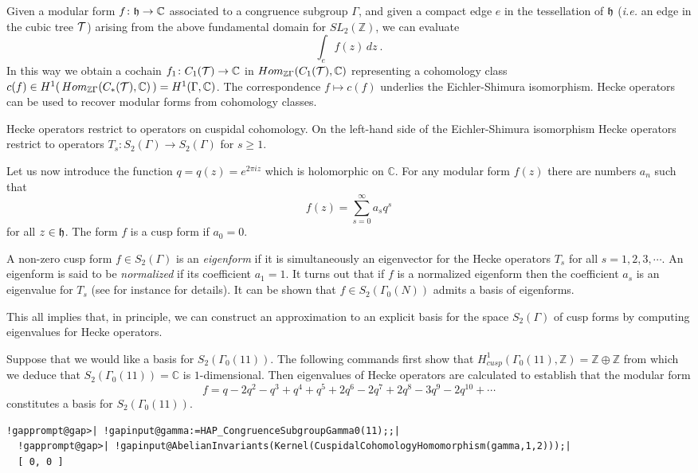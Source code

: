 \documentclass[a4paper,11pt]{report}
\begin{document}
{{Given a modular form $f\colon {\frak h} \rightarrow \mathbb C$ associated to a congruence subgroup $\Gamma$, and given a compact edge $e$ in the tessellation of ${\frak h}$ (\emph{i.e.} an edge in the cubic tree $\cal T$) arising from the above fundamental domain for $SL_2(\mathbb Z)$, we can evaluate 
\[\int_e f(z)\,dz \ .\]
 In this way we obtain a cochain $f_1\colon C_1({\cal T}) \rightarrow \mathbb C$ in $Hom_{\mathbb Z\Gamma}(C_1({\cal T}), \mathbb C)$ representing a cohomology class $c(f) \in H^1(\, Hom_{\mathbb Z\Gamma}(C_\ast({\cal T}), \mathbb C) \,) =
H^1(\Gamma,\mathbb C)$. The correspondence $f\mapsto c(f)$ underlies the Eichler-Shimura isomorphism. Hecke operators can be used to
recover modular forms from cohomology classes. 

Hecke operators restrict to operators on cuspidal cohomology. On the left-hand
side of the Eichler-Shimura isomorphism Hecke operators restrict to operators $T_s\colon S_2(\Gamma) \rightarrow S_2(\Gamma)$ for $s\ge 1$. 

Let us now introduce the function $q=q(z)=e^{2\pi i z}$ which is holomorphic on $\mathbb C$. For any modular form $f(z)$ there are numbers $a_n$ such that 
\[f(z) = \sum_{s=0}^\infty a_sq^s \]
 for all $z\in {\frak h}$. The form $f$ is a cusp form if $a_0=0$. 

 A non-zero cusp form $f\in S_2(\Gamma)$ is an \emph{eigenform} if it is simultaneously an eigenvector for the Hecke operators $T_s$ for all $s =1,2,3,\cdots$. An eigenform is said to be \emph{normalized} if its coefficient $a_1=1$. It turns out that if $f$ is a normalized eigenform then the coefficient $a_s$ is an eigenvalue for $T_s$ (see for instance \cite{stein} for details). It can be shown \cite{atkinlehner} that $f\in S_2(\Gamma_0(N))$ admits a basis of eigenforms. 

 This all implies that, in principle, we can construct an approximation to an
explicit basis for the space $S_2(\Gamma)$ of cusp forms by computing eigenvalues for Hecke operators. 

 Suppose that we would like a basis for $S_2(\Gamma_0(11))$. The following commands first show that $H^1_{cusp}(\Gamma_0(11),\mathbb Z)=\mathbb Z\oplus \mathbb Z$ from which we deduce that $S_2(\Gamma_0(11)) =\mathbb C$ is $1$-dimensional. Then eigenvalues of Hecke operators are calculated to establish
that the modular form 
\[f = q -2q^2 -q^3 +q^4 +q^5 +2q^6 -2q^7 +2q^8 -3q^9 -2q^{10} + \cdots \]
 constitutes a basis for $S_2(\Gamma_0(11))$. 
\begin{Verbatim}[commandchars=!@|,fontsize=\small,frame=single,label=Example]
  !gapprompt@gap>| !gapinput@gamma:=HAP_CongruenceSubgroupGamma0(11);;|
  !gapprompt@gap>| !gapinput@AbelianInvariants(Kernel(CuspidalCohomologyHomomorphism(gamma,1,2)));|
  [ 0, 0 ]
  

\end{Verbatim}}}
\end{document}
